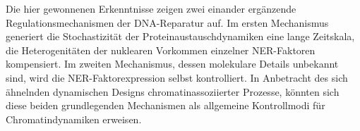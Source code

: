 Die hier gewonnenen Erkenntnisse zeigen zwei einander erg\"{a}nzende Regulationsmechanismen der DNA-Reparatur auf. Im ersten Mechanismus generiert die Stochastizit\"{a}t der Proteinaustauschdynamiken eine lange Zeitskala, die Heterogenit\"{a}ten der nu\-klearen Vorkommen einzelner NER-Faktoren kompensiert. Im zweiten Mechanismus, dessen molekulare Details unbekannt sind, wird die NER-Faktorexpression selbst kontrolliert. In Anbetracht des sich \"{a}hnelnden dynamischen Designs chromatinassoziierter Prozesse, k\"{o}nnten sich diese beiden grundlegenden Mechanismen als allgemeine Kontrollmodi f\"{u}r Chromatindynamiken erweisen.  


  




